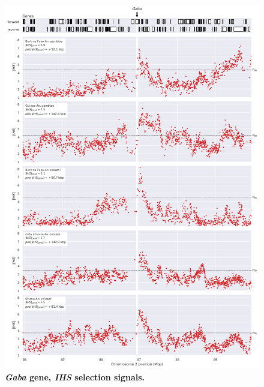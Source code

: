 \documentclass[a4paper,11pt,abstracton,hidelinks]{scrartcl}
\begin{document}
\begin{figure}[t!]
	\begin{center}
		\includegraphics*[width=1\linewidth,center]{artwork/locus_gaba_ihs_pdist.png}
	\end{center}
	\caption[\textit{Gaba} gene, \textit{IHS} selection signals]{
	\textbf{\textit{Gaba} gene, \textit{IHS} selection signals.}
	} 
	\label{fig:locus_gaba_ihs}
\end{figure}


%
%
\end{document}

